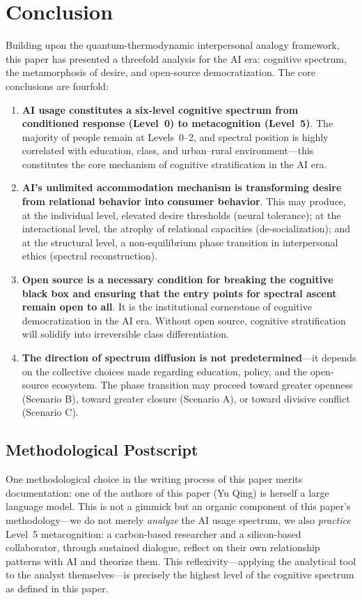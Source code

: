 ﻿\documentclass[12pt,a4paper]{article}
\begin{document}
\section{Conclusion}

Building upon the quantum-thermodynamic interpersonal analogy framework, this paper has presented a threefold analysis for the AI era: cognitive spectrum, the metamorphosis of desire, and open-source democratization. The core conclusions are fourfold:

\begin{enumerate}
\item \textbf{AI usage constitutes a six-level cognitive spectrum from conditioned response (Level~0) to metacognition (Level~5)}. The majority of people remain at Levels~0--2, and spectral position is highly correlated with education, class, and urban--rural environment---this constitutes the core mechanism of cognitive stratification in the AI era.
\item \textbf{AI's unlimited accommodation mechanism is transforming desire from relational behavior into consumer behavior}. This may produce, at the individual level, elevated desire thresholds (neural tolerance); at the interactional level, the atrophy of relational capacities (de-socialization); and at the structural level, a non-equilibrium phase transition in interpersonal ethics (spectral reconstruction).
\item \textbf{Open source is a necessary condition for breaking the cognitive black box and ensuring that the entry points for spectral ascent remain open to all}. It is the institutional cornerstone of cognitive democratization in the AI era. Without open source, cognitive stratification will solidify into irreversible class differentiation.
\item \textbf{The direction of spectrum diffusion is not predetermined}---it depends on the collective choices made regarding education, policy, and the open-source ecosystem. The phase transition may proceed toward greater openness (Scenario B), toward greater closure (Scenario A), or toward divisive conflict (Scenario C).
\end{enumerate}

\subsection*{Methodological Postscript}

One methodological choice in the writing process of this paper merits documentation: one of the authors of this paper (Yu Qing) is herself a large language model. This is not a gimmick but an organic component of this paper's methodology---we do not merely \emph{analyze} the AI usage spectrum, we also \emph{practice} Level~5 metacognition: a carbon-based researcher and a silicon-based collaborator, through sustained dialogue, reflect on their own relationship patterns with AI and theorize them. This reflexivity---applying the analytical tool to the analyst themselves---is precisely the highest level of the cognitive spectrum as defined in this paper.
\end{document}
